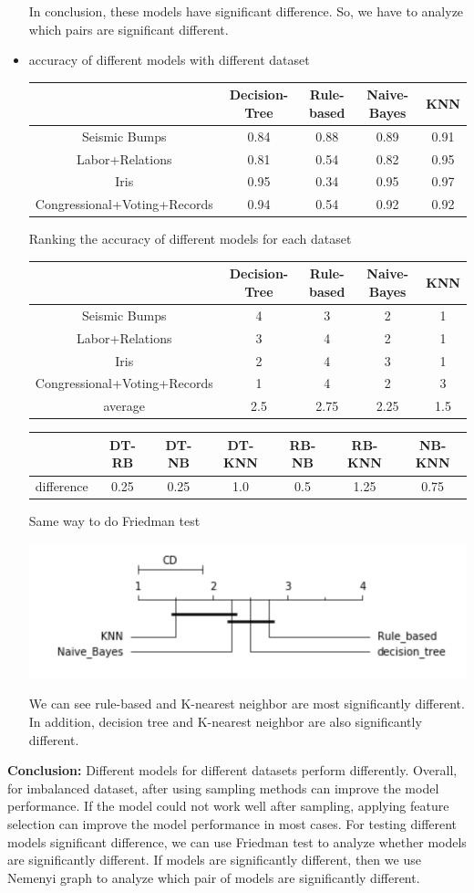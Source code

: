 \documentclass{article}
\begin{document}
\begin{itemize}
In conclusion, these models have significant difference. So, we have to analyze which pairs are significant different.

\item accuracy of different models with different dataset

\begin{tabular}{c|c|c|c|c}
\hline
 &Decision-Tree &Rule-based &Naive-Bayes &KNN\\
\hline
Seismic Bumps &0.84 &0.88 &0.89 &0.91 \\
\hline
Labor+Relations &0.81 &0.54 &0.82 &0.95\\
\hline
Iris &0.95 &0.34 &0.95 &0.97\\
\hline
Congressional+Voting+Records &0.94 &0.54 &0.92 &0.92\\
\end{tabular}

Ranking the accuracy of different models for each dataset

\begin{tabular}{c|c|c|c|c}
\hline
 &Decision-Tree &Rule-based &Naive-Bayes &KNN\\
\hline
Seismic Bumps &4 &3 &2 &1 \\
\hline
Labor+Relations &3 &4 &2 &1\\
\hline
Iris &2 &4 &3 &1\\
\hline
Congressional+Voting+Records &1 &4 &2 &3\\
\hline
average &2.5 &2.75 &2.25 &1.5
\end{tabular}

\begin{tabular}{c|c|c|c|c|c|c}
\hline
 &DT-RB &DT-NB &DT-KNN &RB-NB &RB-KNN &NB-KNN\\
\hline
difference &0.25 &0.25 &1.0 &0.5 &1.25 &0.75
\end{tabular}

Same way to do Friedman test

\includegraphics{CD.png}

We can see rule-based and K-nearest neighbor are most significantly different. In addition, decision tree and K-nearest neighbor are also significantly different.

\end{itemize}

\textbf{Conclusion:}
Different models for different datasets perform differently. Overall, for imbalanced dataset, after using sampling methods can improve the model performance. If the model could not work well after sampling, applying feature selection can improve the model performance in most cases. For testing different models significant difference, we can use Friedman test to analyze whether models are significantly different. If models are significantly different, then we use Nemenyi graph to analyze which pair of models are significantly different.
\end{document}
